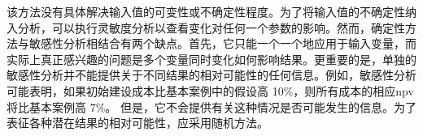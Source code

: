 该方法没有具体解决输入值的可变性或不确定性程度。为了将输入值的不确定性纳入分析，可以执行灵敏度分析以查看变化对任何一个参数的影响。然而，确定性方法与敏感性分析相结合有两个缺点。首先，它只能一个一个地应用于输入变量，而实际上真正感兴趣的问题是多个变量同时变化如何影响结果。更重要的是，单独的敏感性分析并不能提供关于不同结果的相对可能性的任何信息。例如，敏感性分析可能表明，如果初始建设成本比基本案例中的假设高 10\%，则所有成本的相应\acrlong*{npv}将比基本案例高 7\%。 但是，它不会提供有关这种情况是否可能发生的信息。为了表征各种潜在结果的相对可能性，应采用随机方法。

